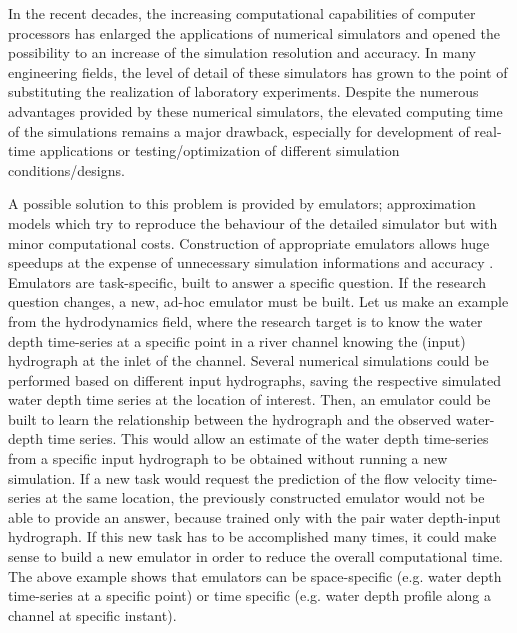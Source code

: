 
In the recent decades, the increasing computational capabilities of computer processors has enlarged the applications of numerical simulators and opened the possibility to an increase of the simulation resolution and accuracy.
In many engineering fields, the level of detail of these simulators has grown to the point of substituting the realization of laboratory experiments. 
Despite the numerous advantages provided by these numerical simulators, the elevated computing time of the simulations remains a major drawback, especially for development of real-time applications or testing/optimization of different simulation conditions/designs.
 
A possible solution to this problem is provided by emulators; approximation models which try to reproduce the behaviour of the detailed simulator but with minor computational costs. Construction of appropriate emulators allows huge speedups at the expense of unnecessary simulation informations and accuracy \autocite{carbajal_appraisal_2016}.\\

Emulators are task-specific, built to answer a specific question.
If the research question changes, a new, ad-hoc emulator must be built.
Let us make an example from the hydrodynamics field, where the research target is to know the water depth time-series at a specific point in a river channel knowing the (input) hydrograph at the inlet of the channel. 
Several numerical simulations could be performed based on different input hydrographs, saving the respective simulated water depth time series at the location of interest. Then, an emulator could be built to learn the relationship between the hydrograph and the observed water-depth time series. 
This would allow an estimate of the water depth time-series from a specific input
hydrograph to be obtained without running a new simulation.
If a new task would request the prediction of the flow velocity time-series at the same location, the previously constructed emulator would not be able to provide an answer, because trained only with the pair water depth-input hydrograph. If this new task has to be accomplished many times, it could make sense to build a new emulator in order to reduce the overall computational time.
The above example shows that emulators can be space-specific (e.g. water depth time-series at a specific point) or time specific (e.g. water depth profile along a channel at specific instant).\\

